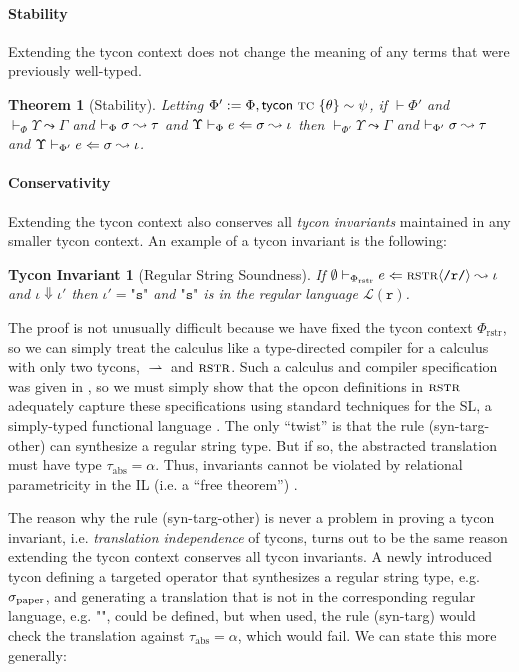 \documentclass[10pt,preprint]{sigplanconf}
\newtheorem{theorem}{Theorem}
\newtheorem{tyconinvariant}{Tycon Invariant}
\newenvironment{proof-sketch}{\noindent{\emph{Proof Sketch.}}}{\qed}
\begin{document}
\paragraph{Stability}
Extending the tycon context does not change the meaning of any terms that were previously well-typed.
\begin{theorem}[Stability]
Letting $\Phi' := \Phi, {\sf tycon}~\textsc{tc} ~\{\theta\} \sim \psi$, if $\vdash \Phi'$ and $\vdash_\Phi \Upsilon \leadsto \Gamma$ and $\vdash_\Phi \sigma \leadsto \tau$ and $\Upsilon \vdash_{\Phi} e \Leftarrow \sigma \leadsto \iota$ then $\vdash_{\Phi'} \Upsilon \leadsto \Gamma$ and $\vdash_{\Phi'} \sigma \leadsto \tau$ and $\Upsilon \vdash_{\Phi'} e \Leftarrow \sigma \leadsto \iota$.
\end{theorem}

\paragraph{Conservativity} 
Extending the tycon context also conserves all \emph{tycon invariants} maintained in any smaller tycon context. An example of a tycon invariant is the following:

\begin{tyconinvariant}[Regular String Soundness]
If $\emptyset \vdash_{\Phi_\text{rstr}} e \Leftarrow {\textsc{rstr}}\langle\texttt{/r/}\rangle \leadsto \iota$ and $\iota \Downarrow \iota'$ then $\iota'=\texttt{"s"}$ and $\texttt{"s"}$ is in the regular language $\mathcal{L}(\texttt{r})$.
\end{tyconinvariant}
\begin{proof-sketch} The proof is not unusually difficult because we have fixed the tycon context $\Phi_\text{rstr}$, so we can simply treat the calculus like a type-directed compiler for a calculus with only two tycons, $\rightharpoonup$ and $\textsc{rstr}$. Such a calculus and compiler specification was given in \cite{sanitation-psp14}, so we must simply show that the opcon definitions in $\textsc{rstr}$ adequately capture these specifications using standard techniques for the SL, a simply-typed functional language \cite{conf/pldi/Chlipala07}. The only ``twist'' is that the rule (syn-targ-other) can synthesize a regular string type. But if so, the abstracted translation must have type $\tau_\text{abs}=\alpha$. Thus, invariants cannot be violated by relational parametricity in the IL (i.e. a ``free theorem'') \cite{WadlerThms}. \end{proof-sketch}

The reason why the rule (syn-targ-other) is never a problem in proving a tycon invariant, i.e. \emph{translation independence} of tycons, turns out to be the same reason extending the tycon context conserves all tycon invariants. A newly introduced tycon defining a targeted operator that synthesizes a regular string type, e.g. $\sigma_\text{paper}$, and generating a translation that is not in the corresponding regular language, e.g. $\texttt{""}$, could be defined, but when used, the rule (syn-targ) would check the translation against $\tau_\text{abs}=\alpha$, which would fail. %
 We can state this more generally:
\end{document}
